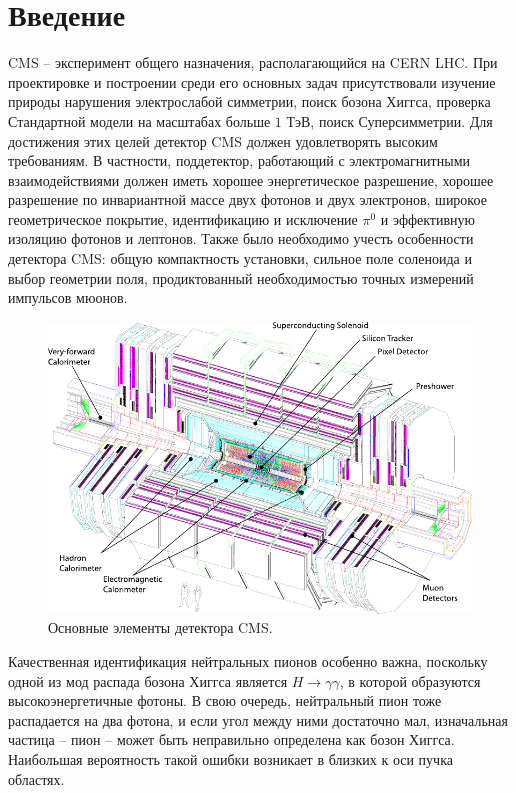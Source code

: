 \documentclass[a4paper, 10pt, twocolumn]{article}
\begin{document}

\section{Введение}
CMS -- эксперимент общего назначения, располагающийся на CERN LHC. 
При проектировке и построении среди его основных задач присутствовали изучение природы нарушения электрослабой симметрии, поиск бозона Хиггса, проверка Стандартной модели на масштабах больше $1$ ТэВ, поиск Суперсимметрии. 
Для достижения этих целей детектор CMS должен удовлетворять высоким требованиям. 
В частности, поддетектор, работающий с электромагнитными взаимодействиями должен иметь хорошее энергетическое разрешение, хорошее разрешение по инвариантной массе двух фотонов и двух электронов, широкое геометрическое покрытие, идентификацию и исключение $\pi^0$ и эффективную изоляцию фотонов и лептонов.  
Также было необходимо учесть особенности детектора CMS: общую компактность установки, сильное поле соленоида и выбор геометрии поля, продиктованный необходимостью точных измерений импульсов мюонов. 

\begin{figure}
\includegraphics[width=.6\linewidth]{figures/CMS_view.pdf}
\caption{Основные элементы детектора CMS.}
\label{fig:view}
\end{figure}

Качественная идентификация нейтральных пионов особенно важна, поскольку одной из мод распада бозона Хиггса является $H\to\gamma\gamma$, в которой образуются высокоэнергетичные фотоны. 
В свою очередь, нейтральный пион тоже распадается на два фотона, и если угол между ними достаточно мал, изначальная частица -- пион -- может быть неправильно определена как бозон Хиггса. 
Наибольшая вероятность такой ошибки возникает в близких к оси пучка областях. 
\end{document}
